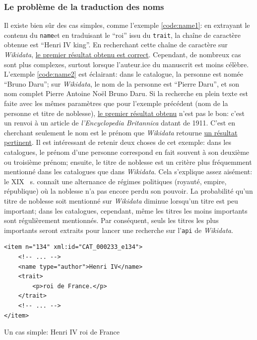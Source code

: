 \documentclass[a4paper, 12pt, twoside]{book}
\newenvironment{code}{\captionsetup{type=listing}}{}
\newcommand{\scl}[1]{%
	#1%
	\ifthenelse{\equal{#1}{I}}{\up{er}}{\up{ème}}%
	~s.%
}
\newcommand{\api}{\texttt{\gls{api}}}
\newcommand{\tname}{\texttt{name}}
\newcommand{\ttrait}{\texttt{trait}}
\newcommand{\wkd}{\textit{Wikidata}}
\begin{document}
\subsubsection{Le problème de la traduction des noms}
Il existe bien sûr des cas simples, comme l'exemple \ref{code:name1}: en extrayant le contenu du \tname et en traduisant le \enquote{roi} issu du \ttrait{}, la chaîne de caractère obtenue est \enquote{Henri IV king}. En recherchant cette chaîne de caractère sur \wkd{}, \href{https://www.wikidata.org/w/index.php?search=Henri+IV+king\&title=Special:Search\&profile=advanced\&fulltext=1\&ns0=1\&ns120=1}{le premier résultat obtenu est correct}. Cependant, de nombreux cas sont plus complexes, surtout lorsque l'auteur.ice du manuscrit est moins célèbre. L'exemple \ref{code:name2} est éclairant: dans le catalogue, la personne est nomée \enquote{Bruno Daru}; sur \wkd{}, le nom de la personne est \enquote{Pierre Daru}, et son nom complet {Pierre Antoine Noël Bruno Daru}. Si la recherche en plein texte est faite avec les mêmes paramètres que pour l'exemple précédent (nom de la personne et titre de noblesse), \href{https://www.wikidata.org/w/index.php?search=bruno+daru+count&title=Special:Search&profile=advanced&fulltext=1&ns0=1&ns120=1}{le premier résultat obtenu} n'est pas le bon: c'est un renvoi à un article de \textit{l'Encyclopedia Britannica} datant de 1911. C'est en cherchant seulement le nom est le prénom que \wkd{} retourne \href{https://www.wikidata.org/w/index.php?search=bruno+daru&title=Special:Search&profile=advanced&fulltext=1&ns0=1&ns120=1}{un résultat pertinent}. Il est intéressant de retenir deux choses de cet exemple: dans les catalogues, le prénom d'une personne correspond en fait souvent à son deuxième ou troisième prénom; ensuite, le titre de noblesse est un critère plus fréquemment mentionné dans les catalogues que dans \wkd{}. Cela s'explique assez aisément: le \scl{XIX} connaît une alternance de régimes politiques (royauté, empire, république) où la noblesse n'a pas encore perdu son pouvoir. La probabilité qu'un titre de noblesse soit mentionné sur \wkd{} diminue lorsqu'un titre est peu important; dans les catalogues, cependant, même les titres les moins importants sont régulièrement mentionnés. Par conséquent, seuls les titres les plus importants seront extraits pour lancer une recherche sur l'\api{} de \wkd{}.

\begin{code}
	\begin{verbatim}
<item n="134" xml:id="CAT_000233_e134">
	<!-- ... -->
	<name type="author">Henri IV</name>
	<trait>
		<p>roi de France.</p>
	</trait>
	<!-- ... -->
</item>
	\end{verbatim}
	\caption{Un cas simple: Henri IV roi de France}
	\label{code:name1}
\end{code}
\end{document}
